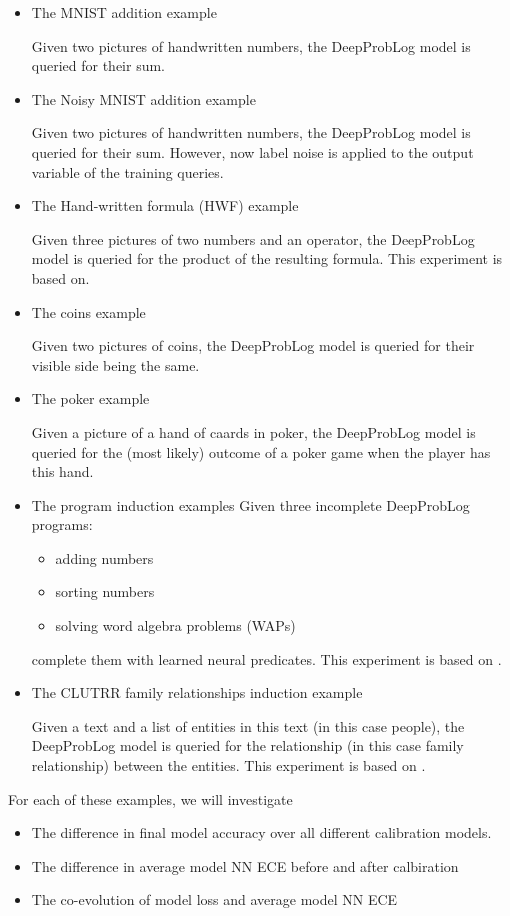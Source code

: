 \begin{itemize}
\item The MNIST addition example\par
Given two pictures of handwritten numbers, the DeepProbLog model is queried for their sum.
\item The Noisy MNIST addition example\par
Given two pictures of handwritten numbers, the DeepProbLog model is queried for their sum. However, now label noise is applied to the output variable of the training queries.
\item The Hand-written formula (HWF) example\par
Given three pictures of two numbers and an operator, the DeepProbLog model is queried for the product of the resulting formula. This experiment is based on\cite{li2020hwf}.
\item The coins example\par
Given two pictures of coins, the DeepProbLog model is queried for their visible side being the same.
\item The poker example\par
Given a picture of a hand of caards in poker, the DeepProbLog model is queried for the (most likely) outcome of a poker game when the player has this hand.
\item The program induction examples
Given three incomplete DeepProbLog programs:
\begin{itemize}
\item adding numbers
\item sorting numbers
\item solving word algebra problems (WAPs)
\end{itemize}
complete them with learned neural predicates. This experiment is based on \cite{riedel2016forth}.
\item The CLUTRR family relationships induction example\par
Given a text and a list of entities in this text (in this case people), the DeepProbLog model is queried for the relationship (in this case family relationship) between the entities. This experiment is based on \cite{sinha2019clutrr}.
\end{itemize}
For each of these examples, we will investigate
\begin{itemize}
  \item The difference in final model accuracy over all different calibration models.
  \item The difference in average model NN ECE before and after calbiration
  \item The co-evolution of model loss and average model NN ECE
\end{itemize}
